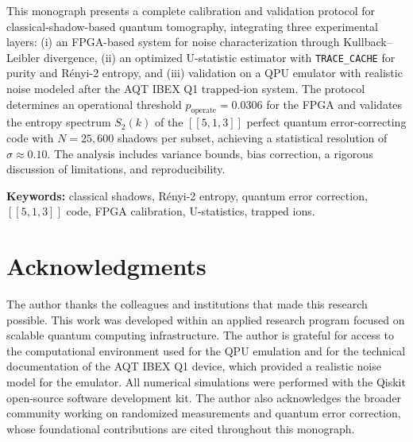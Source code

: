 \documentclass[12pt,a4paper,oneside]{book}
\theoremstyle{plain}
\theoremstyle{definition}
\theoremstyle{remark}
\begin{document}
This monograph presents a complete calibration and validation protocol for classical-shadow-based quantum tomography, integrating three experimental layers: (i) an FPGA-based system for noise characterization through Kullback--Leibler divergence, (ii) an optimized U-statistic estimator with \texttt{TRACE\_CACHE} for purity and R\'enyi-2 entropy, and (iii) validation on a QPU emulator with realistic noise modeled after the AQT IBEX Q1 trapped-ion system. The protocol determines an operational threshold $p_{\text{operate}} = 0.0306$ for the FPGA and validates the entropy spectrum $S_2(k)$ of the $[[5,1,3]]$ perfect quantum error-correcting code with $N = 25{,}600$ shadows per subset, achieving a statistical resolution of $\sigma \approx 0.10$. The analysis includes variance bounds, bias correction, a rigorous discussion of limitations, and reproducibility.

\textbf{Keywords:} classical shadows, R\'enyi-2 entropy, quantum error correction, $[[5,1,3]]$ code, FPGA calibration, U-statistics, trapped ions.

\chapter*{Acknowledgments}

The author thanks the colleagues and institutions that made this research possible. This work was developed within an applied research program focused on scalable quantum computing infrastructure. The author is grateful for access to the computational environment used for the QPU emulation and for the technical documentation of the AQT IBEX Q1 device, which provided a realistic noise model for the emulator. All numerical simulations were performed with the Qiskit open-source software development kit. The author also acknowledges the broader community working on randomized measurements and quantum error correction, whose foundational contributions are cited throughout this monograph.

\tableofcontents
\listoffigures
\listoftables

\end{document}
